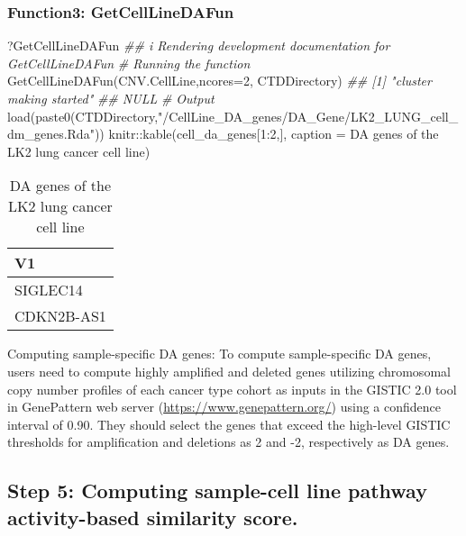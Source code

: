 \documentclass[]{article}
\newcommand{\hlnum}[1]{\textcolor[rgb]{0.816,0.125,0.439}{#1}}%
\newcommand{\hlstr}[1]{\textcolor[rgb]{0.251,0.627,0.251}{#1}}%
\newcommand{\hlcom}[1]{\textcolor[rgb]{0.502,0.502,0.502}{\textit{#1}}}%
\newcommand{\hlstd}[1]{\textcolor[rgb]{0.251,0.251,0.251}{#1}}%
\newenvironment{Shaded}{\begin{myshaded}}{\end{myshaded}}
\newcommand{\DecValTok}[1]{\hlnum{#1}}
\newcommand{\SpecialCharTok}[1]{\hlstr{#1}}
\newcommand{\StringTok}[1]{\hlstr{#1}}
\newcommand{\CommentTok}[1]{\hlcom{#1}}
\newcommand{\DocumentationTok}[1]{\hlcom{#1}}
\newcommand{\FunctionTok}[1]{\hlstd{#1}}
\newcommand{\AttributeTok}[1]{{#1}}
\newcommand{\NormalTok}[1]{\hlstd{#1}}
\begin{document}
\hypertarget{function3-getcelllinedafun}{%
\subsubsection{\texorpdfstring{ Function3: GetCellLineDAFun}{  Function3: GetCellLineDAFun}}\label{function3-getcelllinedafun}}

\begin{Shaded}
\begin{Highlighting}[]
\NormalTok{?GetCellLineDAFun}
\DocumentationTok{\#\# i Rendering development documentation for \textquotesingle{}GetCellLineDAFun\textquotesingle{}}
\CommentTok{\# Running the function}
\FunctionTok{GetCellLineDAFun}\NormalTok{(CNV.CellLine,}\AttributeTok{ncores=}\DecValTok{2}\NormalTok{, CTDDirectory)}
\DocumentationTok{\#\# [1] "cluster making started"}
\DocumentationTok{\#\# NULL}
\CommentTok{\# Output}
\FunctionTok{load}\NormalTok{(}\FunctionTok{paste0}\NormalTok{(CTDDirectory,}\StringTok{"/CellLine\_DA\_genes/DA\_Gene/LK2\_LUNG\_cell\_dm\_genes.Rda"}\NormalTok{))}
\NormalTok{knitr}\SpecialCharTok{::}\FunctionTok{kable}\NormalTok{(cell\_da\_genes[}\DecValTok{1}\SpecialCharTok{:}\DecValTok{2}\NormalTok{,], }\AttributeTok{caption =} \StringTok{\textquotesingle{}DA genes of the LK2 lung cancer cell line\textquotesingle{}}\NormalTok{)}
\end{Highlighting}
\end{Shaded}

\begin{table}

\caption{\label{tab:unnamed-chunk-83}DA genes of the LK2 lung cancer cell line}
\centering
\begin{tabular}[t]{l}
\hline
V1\\
\hline
SIGLEC14\\
\hline
CDKN2B-AS1\\
\hline
\end{tabular}
\end{table}

Computing sample-specific DA genes: To compute sample-specific DA genes, users need to compute highly amplified and deleted genes utilizing chromosomal copy number profiles of each cancer type cohort as inputs in the GISTIC 2.0 tool in GenePattern web server (\url{https://www.genepattern.org/}) using a confidence interval of 0.90. They should select the genes that exceed the high-level GISTIC thresholds for amplification and deletions as 2 and -2, respectively as DA genes.

\hypertarget{step-5-computing-sample-cell-line-pathway-activity-based-similarity-score.}{%
\subsection{\texorpdfstring{ Step 5: Computing sample-cell line pathway activity-based similarity score.}{  Step 5: Computing sample-cell line pathway activity-based similarity score.}}\label{step-5-computing-sample-cell-line-pathway-activity-based-similarity-score.}}
\end{document}
